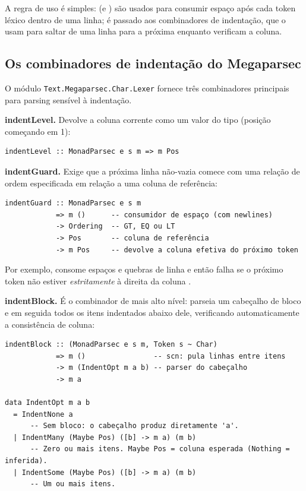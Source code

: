 A regra de uso é simples:  (e ) são usados
para consumir espaço após cada token léxico dentro de uma linha;
 é passado aos combinadores de indentação, que o usam
para saltar de uma linha para a próxima enquanto verificam a coluna.

\subsection{Os combinadores de indentação do Megaparsec}

O módulo \texttt{Text.Megaparsec.Char.Lexer} fornece três combinadores
principais para parsing sensível à indentação.

\textbf{indentLevel.} Devolve a coluna corrente como um valor do
tipo  (posição começando em 1):

\begin{verbatim}
indentLevel :: MonadParsec e s m => m Pos
\end{verbatim}

\textbf{indentGuard.} Exige que a próxima linha não-vazia comece com
uma relação de ordem especificada em relação a uma coluna de referência:

\begin{verbatim}
indentGuard :: MonadParsec e s m
            => m ()      -- consumidor de espaço (com newlines)
            -> Ordering  -- GT, EQ ou LT
            -> Pos       -- coluna de referência
            -> m Pos     -- devolve a coluna efetiva do próximo token
\end{verbatim}

Por exemplo,  consome espaços e
quebras de linha e então falha se o próximo token não estiver
\emph{estritamente} à direita da coluna .

\textbf{indentBlock.} É o combinador de mais alto nível: parseia um
cabeçalho de bloco e em seguida todos os itens indentados abaixo
dele, verificando automaticamente a consistência de coluna:

\begin{verbatim}
indentBlock :: (MonadParsec e s m, Token s ~ Char)
            => m ()                -- scn: pula linhas entre itens
            -> m (IndentOpt m a b) -- parser do cabeçalho
            -> m a

data IndentOpt m a b
  = IndentNone a
      -- Sem bloco: o cabeçalho produz diretamente 'a'.
  | IndentMany (Maybe Pos) ([b] -> m a) (m b)
      -- Zero ou mais itens. Maybe Pos = coluna esperada (Nothing = inferida).
  | IndentSome (Maybe Pos) ([b] -> m a) (m b)
      -- Um ou mais itens.
\end{verbatim}

